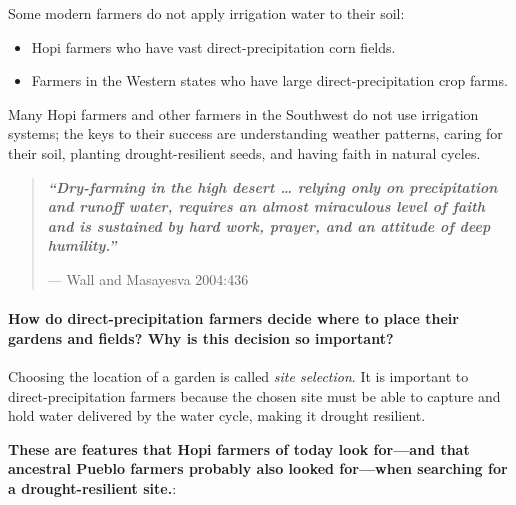 \documentclass[12pt,]{article}
\providecommand{\tightlist}{%
  \setlength{\itemsep}{0pt}\setlength{\parskip}{0pt}}
\let\oldparagraph\paragraph
\renewcommand{\paragraph}[1]{\oldparagraph{#1}\mbox{}}
\begin{document}
Some modern farmers do not apply irrigation water to their soil:

\begin{itemize}
\tightlist
\item
  Hopi farmers who have vast direct-precipitation corn fields.
\item
  Farmers in the Western states who have large direct-precipitation crop farms.
\end{itemize}

Many Hopi farmers and other farmers in the Southwest do not use irrigation systems; the keys to their success are understanding weather patterns, caring for their soil, planting drought-resilient seeds, and having faith in natural cycles.

\begin{quote}
\textbf{\emph{``Dry-farming in the high desert \ldots{} relying only on precipitation and runoff water, requires an almost miraculous level of faith and is sustained by hard work, prayer, and an attitude of deep humility.''}}

--- Wall and Masayesva 2004:436
\end{quote}

\hypertarget{how-do-direct-precipitation-farmers-decide-where-to-place-their-gardens-and-fields-why-is-this-decision-so-important}{%
\paragraph{How do direct-precipitation farmers decide where to place their gardens and fields? Why is this decision so important?}\label{how-do-direct-precipitation-farmers-decide-where-to-place-their-gardens-and-fields-why-is-this-decision-so-important}}

Choosing the location of a garden is called \emph{site selection}. It is important to direct-precipitation farmers because the chosen site must be able to capture and hold water delivered by the water cycle, making it drought resilient.

\textbf{These are features that Hopi farmers of today look for---and that ancestral Pueblo farmers probably also looked for---when searching for a drought-resilient site.}:
\end{document}
